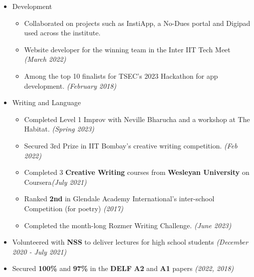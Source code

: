 \begin{itemize}[itemsep = -0.8 mm, leftmargin=*]
    \item Development
    \vspace{-5pt}
    \begin{itemize}[itemsep = -0.8 mm,]
        \item Collaborated on projects such as InstiApp, a No-Dues portal and Digipad used across the institute.
        \item Website developer for the winning team in the Inter IIT Tech Meet \hfill{\sl \small (March 2022)}
        \item Among the top 10 finalists for TSEC's 2023 Hackathon for app development. \hfill{\sl \small (February 2018)}
    \end{itemize}
    \vspace{-5pt}
    \item Writing and Language
    \vspace{-5pt}
    \begin{itemize}
        \item Completed Level 1 Improv with Neville Bharucha and a workshop at The Habitat. \hfill{\sl \small (Spring 2023)}
        \item Secured 3rd Prize in IIT Bombay's creative writing competition. \hfill{\sl \small (Feb 2022)}
        \item Completed 3 \textbf{Creative Writing} courses from {\bf Wesleyan University} on Coursera\hfill{\sl \small (July 2021)}
        \item Ranked {\bf 2nd} in Glendale Academy International's inter-school Competition (for poetry) \hfill{\sl \small (2017)}
        \item Completed the month-long Rozmer Writing Challenge. \hfill{\sl \small (June 2023)} 
    \end{itemize}
    \item Volunteered with {\bf NSS} to deliver lectures for high school students \hfill{\sl \small (December 2020 - July 2021)}
    \item Secured {\bf 100\%} and {\bf 97\%} in the {\bf DELF} {\bf A2} and {\bf A1} papers \hfill{\sl \small (2022, 2018)}
 \end{itemize}